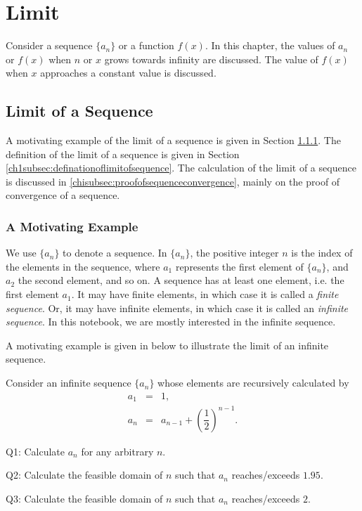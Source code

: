 \chapter{Limit} \label{ch1title}

Consider a sequence $\{a_n\}$ or a function $f(x)$. In this chapter, the values of $a_n$ or $f(x)$ when $n$ or $x$ grows towards infinity are discussed. The value of $f(x)$ when $x$ approaches a constant value is discussed.

\section{Limit of a Sequence} \label{ch1sec:limitofsequence}

A motivating example of the limit of a sequence is given in Section \ref{ch1subsec:sequencemotivatingexample}. The definition of the limit of a sequence is given in Section \ref{ch1subsec:definationoflimitofsequence}. The calculation of the limit of a sequence is discussed in \ref{chisubsec:proofofsequenceconvergence}, mainly on the proof of convergence of a sequence.

\subsection{A Motivating Example} \label{ch1subsec:sequencemotivatingexample}

We use $\{a_n\}$ to denote a sequence. In $\{a_n\}$, the positive integer $n$ is the index of the elements in the sequence, where $a_1$ represents the first element of $\{a_n\}$, and $a_2$ the second element, and so on. A sequence has at least one element, i.e. the first element $a_1$. It may have finite elements, in which case it is called a \textit{finite sequence}. Or, it may have infinite elements, in which case it is called an \textit{infinite sequence}. In this notebook, we are mostly interested in the infinite sequence.

A motivating example is given in below to illustrate the limit of an infinite sequence.

\begin{shortbox}

Consider an infinite sequence $\{a_n\}$ whose elements are recursively calculated by
\begin{eqnarray}
  a_1 &=& 1, \label{ch1eq:motivatingexampleinitialcondition} \\
  a_n &=& a_{n-1} + \left(\dfrac{1}{2}\right)^{n-1}. \label{ch1eq:motivatingexamplerecursive}
\end{eqnarray}

Q1: Calculate $a_n$ for any arbitrary $n$.

Q2: Calculate the feasible domain of $n$ such that $a_n$ reaches/exceeds $1.95$.

Q3: Calculate the feasible domain of $n$ such that $a_n$ reaches/exceeds $2$.
\end{shortbox}

